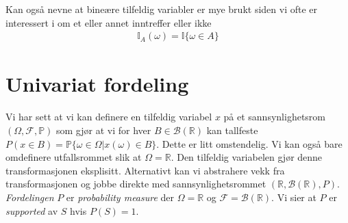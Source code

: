 Kan også nevne at bineære tilfeldig variabler er mye brukt siden vi ofte er interessert i om et eller annet inntreffer eller ikke
\begin{align}
\mathbb{I}_A(\omega)=\mathbb{I}\{\omega \in A\}
\end{align}
\section{Univariat fordeling}
Vi har sett at vi kan definere en tilfeldig variabel $x$ på et sannsynlighetsrom $(\Omega,\mathscr{F},\mathbb{P})$ som gjør at vi for hver $B \in \mathscr{B}(\mathbb{R})$ kan tallfeste $P(x \in B) = \mathbb{P}\{\omega \in \Omega | x(\omega) \in B\}$. Dette er litt omstendelig. Vi kan også bare omdefinere utfallsrommet slik at $\Omega = \mathbb{R}$. Den tilfeldig variabelen gjør denne transformasjonen eksplisitt. Alternativt kan vi abstrahere vekk fra transformasjonen og jobbe direkte med sannsynlighetsrommet $(\mathbb{R},\mathscr{B}(\mathbb{R}), P)$. \textit{Fordelingen} $P$ er \textit{probability measure} der $\Omega  = \mathbb{R}$ og $\mathscr{F} = \mathscr{B}(\mathbb{R})$. Vi sier at $P$ er \textit{supported} av $S$ hvis $P(S)=1$. 

